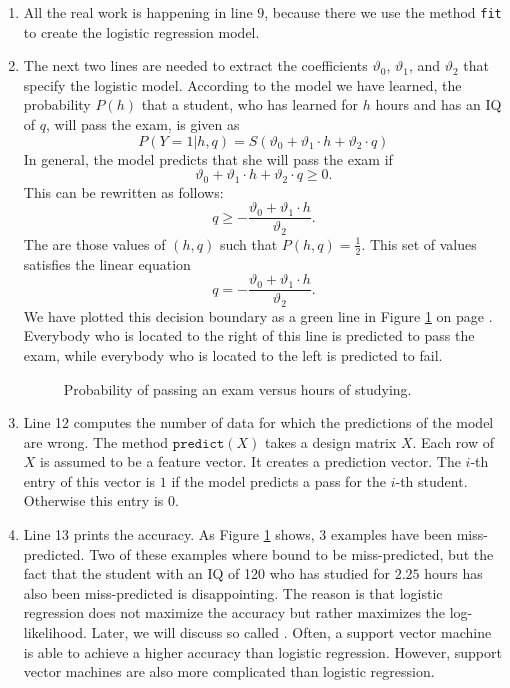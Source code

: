 \begin{enumerate}
\begin{enumerate}
      \end{enumerate}
\item All the real work is happening in line 9, because there we use the method \texttt{fit} to create the
      logistic regression model.
\item The next two lines are needed to extract the coefficients $\vartheta_0$, $\vartheta_1$, and $\vartheta_2$
      that specify the logistic model.      
      According to the model we have learned, the probability $P(h)$ that a student, who has learned for $h$
      hours and has an IQ of $q$, will pass the exam, is given as 
      $$ P(Y=1|h,q) = S(\vartheta_0 + \vartheta_1 \cdot h + \vartheta_2 \cdot q) $$
      In general, the model predicts that she will pass the exam if
      $$ \vartheta_0 + \vartheta_1 \cdot h + \vartheta_2 \cdot q \geq 0. $$
      This can be rewritten as follows:
      $$  q \geq -\frac{\vartheta_0 + \vartheta_1 \cdot h}{\vartheta_2}. $$
      The  are those values of $(h, q)$ such that $P(h, q) = \frac{1}{2}$.  This set of
      values satisfies the linear equation
      $$  q = -\frac{\vartheta_0 + \vartheta_1 \cdot h}{\vartheta_2}. $$
      We have plotted this decision boundary as a green line in Figure \ref{fig:exam-iq-boundary.pdf} on page
      \pageref{fig:exam-iq-boundary.pdf}.  Everybody who is located to the right of this line is predicted to pass the exam,
      while everybody who is located to the left is predicted to fail.


\begin{figure}[!th]
\caption{Probability of passing an exam versus hours of studying.}
\label{fig:exam-iq-boundary.pdf}
\end{figure}
\FloatBarrier
\item Line 12 computes the number of data for which the predictions of the model are wrong.
      The method $\texttt{predict}(X)$ takes a design matrix $X$.  Each row of $X$ is assumed to be a feature
      vector. It creates a prediction vector.  The $i$-th entry of this vector is $1$ if the model predicts a
      pass for the $i$-th student.  Otherwise this entry is $0$.
\item Line 13 prints the accuracy.  As Figure \ref{fig:exam-iq-boundary.pdf} shows, 3 examples have been
      miss-predicted.  Two of these examples where bound to be miss-predicted, but the fact that the student
      with an IQ of 120 who has studied for $2.25$ hours has also been miss-predicted is disappointing.
      The reason is that logistic regression does not maximize the accuracy but rather
      maximizes the log-likelihood.  Later, we will discuss so called 
      .  Often, a support vector machine is able to achieve a higher accuracy
      than logistic regression.  However, support vector machines are also more complicated than logistic regression.
 \end{enumerate}

